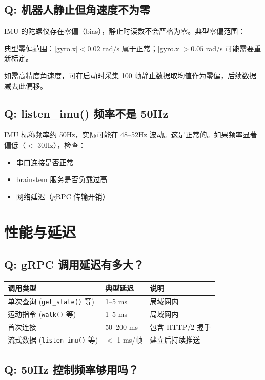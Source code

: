 \documentclass[a4paper,11pt,openany]{book}
\begin{document}
\subsection{Q: 机器人静止但角速度不为零}

IMU 的陀螺仪存在零偏（bias），静止时读数不会严格为零。典型零偏范围：

典型零偏范围：$|\text{gyro.x}| < 0.02$ rad/s 属于正常；$|\text{gyro.x}| > 0.05$ rad/s 可能需要重新标定。

如需高精度角速度，可在启动时采集 100 帧静止数据取均值作为零偏，后续数据减去此偏移。

\subsection{Q: listen\_imu() 频率不是 50Hz}

IMU 标称频率约 50Hz，实际可能在 48--52Hz 波动。这是正常的。如果频率显著偏低（$<$ 30Hz），检查：
\begin{itemize}[nosep]
  \item 串口连接是否正常
  \item brainstem 服务是否负载过高
  \item 网络延迟（gRPC 传输开销）
\end{itemize}

\section{性能与延迟}

\subsection{Q: gRPC 调用延迟有多大？}

\begin{longtable}{lll}
\toprule
调用类型 & 典型延迟 & 说明 \\
\midrule
\endhead
单次查询 (\texttt{get\_state()} 等) & 1--5 ms & 局域网内 \\
运动指令 (\texttt{walk()} 等) & 1--5 ms & 局域网内 \\
首次连接 & 50--200 ms & 包含 HTTP/2 握手 \\
流式数据 (\texttt{listen\_imu()} 等) & $<$ 1 ms/帧 & 建立后持续推送 \\
\bottomrule
\end{longtable}

\subsection{Q: 50Hz 控制频率够用吗？}
\end{document}
